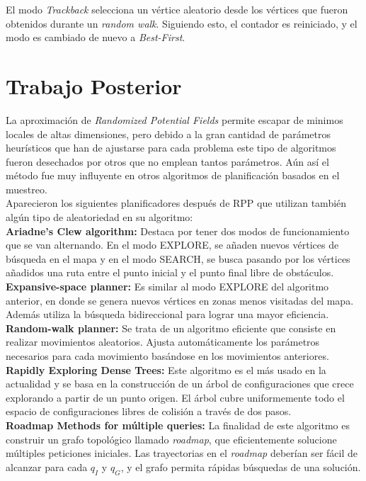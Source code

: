 \documentclass[a4paper, fontsize=11pt]{scrartcl} %
\numberwithin{equation}{section} %
\numberwithin{figure}{section} %
\numberwithin{table}{section} %
\begin{document}
	El modo \textit{Trackback} selecciona un vértice aleatorio desde los vértices que fueron obtenidos durante un \textit{random walk}. Siguiendo esto, el contador es reiniciado, y el modo es cambiado de nuevo a \textit{Best-First}.
	\section{Trabajo Posterior}
	
	La aproximación de \textit{Randomized Potential Fields} permite escapar de minimos locales de altas dimensiones, pero debido a la gran cantidad de parámetros heurísticos que han de ajustarse para cada problema este tipo de algoritmos fueron desechados por otros que no emplean tantos parámetros. Aún así el método fue muy influyente en otros algoritmos de planificación basados en el muestreo.\\
	
	Aparecieron los siguientes planificadores después de RPP que utilizan también algún tipo de aleatoriedad en su algoritmo:\\
	
	\textbf{Ariadne’s Clew algorithm:} Destaca por tener dos modos de funcionamiento que se van alternando. En el modo EXPLORE, se añaden nuevos vértices de búsqueda en el mapa y en el modo SEARCH, se busca pasando por los vértices añadidos una ruta entre el punto inicial y el punto final libre de obstáculos.\\
	
	\textbf{Expansive-space planner:} Es similar al modo EXPLORE del algoritmo anterior, en donde se genera nuevos vértices en zonas menos visitadas del mapa. Además utiliza la búsqueda bidireccional para lograr una mayor eficiencia.\\
	
	\textbf{Random-walk planner:} Se trata de un algoritmo eficiente que consiste en realizar movimientos aleatorios. Ajusta automáticamente los parámetros necesarios para cada movimiento basándose en los movimientos anteriores.\\
	
	\textbf{Rapidly Exploring Dense Trees:} Este algoritmo es el más usado en la actualidad y se basa en la construcción de un árbol de configuraciones que crece explorando a partir de un punto origen. El árbol cubre uniformemente todo el espacio de configuraciones libres de colisión a través de dos pasos.\\
	
	\textbf{Roadmap Methods for múltiple queries:} La finalidad de este algoritmo es construir un grafo topológico llamado \textit{roadmap}, que eficientemente solucione múltiples peticiones iniciales. Las trayectorias en el \textit{roadmap} deberían ser fácil de alcanzar para cada $q_I$ y $q_G$, y el grafo permita rápidas búsquedas de una solución.\\
	
 	
\end{document}
